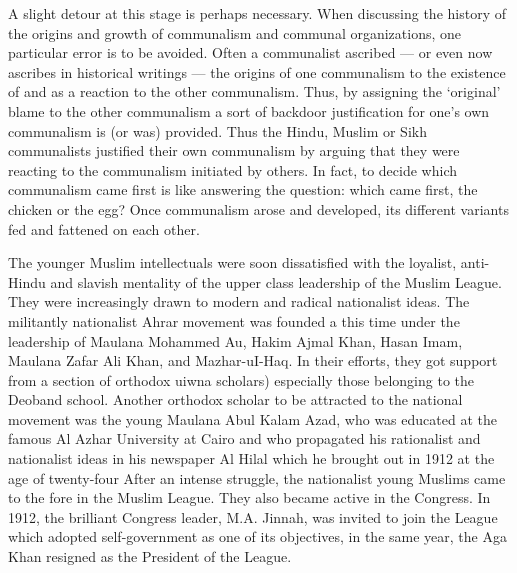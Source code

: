 \begin{multicols}{2}
A slight detour at this stage is perhaps necessary. When discussing the history of the origins and growth of communalism and communal organizations, one particular error is to be avoided. Often a communalist ascribed --- or even now ascribes in historical writings --- the origins of one communalism to the existence of and as a reaction to the other communalism. Thus, by assigning the `original' blame to the other communalism a sort of backdoor justification for one's own communalism is (or was) provided. Thus the Hindu, Muslim or Sikh communalists justified their own communalism by arguing that they were reacting to the communalism initiated by others. In fact, to decide which communalism came first is like answering the question: which came first, the chicken or the egg? Once communalism arose and developed, its different variants fed and fattened on each other. 

The younger Muslim intellectuals were soon dissatisfied with the loyalist, anti-Hindu and slavish mentality of the upper class leadership of the Muslim League. They were increasingly drawn to modern and radical nationalist ideas. The militantly nationalist Ahrar movement was founded a this time under the leadership of Maulana Mohammed Au, Hakim Ajmal Khan, Hasan Imam, Maulana Zafar Ali Khan, and Mazhar-uI-Haq. In their efforts, they got support from a section of orthodox uiwna scholars) especially those belonging to the Deoband school. Another orthodox scholar to be attracted to the national movement was the young Maulana Abul Kalam Azad, who was educated at the famous Al Azhar University at Cairo and who propagated his rationalist and nationalist ideas in his newspaper Al Hilal which he brought out in 1912 at the age of twenty-four After an intense struggle, the nationalist young Muslims came to the fore in the Muslim League. They also became active in the Congress. In 1912, the brilliant Congress leader, M.A. Jinnah, was invited to join the League which adopted self-government as one of its objectives, in the same year, the Aga Khan resigned as the President of the League. 


\end{multicols}
